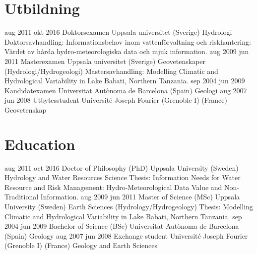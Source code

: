 \ifswedish
    \section{Utbildning}
        \position
            {aug 2011 \textemdash{} okt 2016}
            {Doktorsexamen}
            {Uppsala universitet (Sverige)}
            {Hydrologi \newline
            Doktorsavhandling: Informationsbehov inom vattenförvaltning och riskhantering: Värdet av hårda hydro-meteorologiska data och mjuk information.}
        \position
            {aug 2009 \textemdash{} jun 2011}
            {Masterexamen}
            {Uppsala universitet (Sverige)}
            {Geovetenskaper (Hydrologi/Hydrogeologi) \newline
            Mastersavhandling: Modelling Climatic and Hydrological Variability in Lake Babati, Northern Tanzania.}
        \position
            {sep 2004 \textemdash{} jun 2009}
            {Kandidatexamen}
            {Universitat Autònoma de Barcelona (Spain)}
            {Geologi}
        \position
            {aug 2007 \textemdash{} jun 2008}
            {Utbytesstudent}
            {Université Joseph Fourier (Grenoble I) (France)}
            {Geovetenskap}
\else
    \section{Education}
        \position
            {aug 2011 \textemdash{} oct 2016}
            {Doctor of Philosophy (PhD)}
            {Uppsala University (Sweden)}
            {Hydrology and Water Resources Science \newline
            Thesis: Information Needs for Water Resource and Risk Management: Hydro-Meteorological Data Value and Non-Traditional Information.}
        \position
            {aug 2009 \textemdash{} jun 2011}
            {Master of Science (MSc)}
            {Uppsala University (Sweden)}
            {Earth Sciences (Hydrology/Hydrogeology) \newline
            Thesis: Modelling Climatic and Hydrological Variability in Lake Babati, Northern Tanzania.}
        \position
            {sep 2004 \textemdash{} jun 2009}
            {Bachelor of Science (BSc)}
            {Universitat Autònoma de Barcelona (Spain)}
            {Geology}
        \position
            {aug 2007 \textemdash{} jun 2008}
            {Exchange student}
            {Université Joseph Fourier (Grenoble I) (France)}
            {Geology and Earth Sciences}
\fi